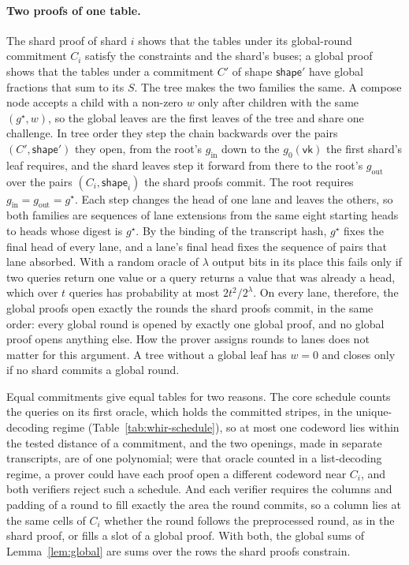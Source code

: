 \paragraph{Two proofs of one table.} The shard proof of shard $i$ shows that the tables under its global-round commitment $C_i$ satisfy the constraints and the shard's buses; a global proof shows that the tables under a commitment $C'$ of shape $\mathsf{shape}'$ have global fractions that sum to its $S$. The tree makes the two families the same. A compose node accepts a child with a non-zero $w$ only after children with the same $(g^\star, w)$, so the global leaves are the first leaves of the tree and share one challenge. In tree order they step the chain backwards over the pairs $(C', \mathsf{shape}')$ they open, from the root's $g_{\mathrm{in}}$ down to the $g_0(\mathsf{vk})$ the first shard's leaf requires, and the shard leaves step it forward from there to the root's $g_{\mathrm{out}}$ over the pairs $(C_i, \mathsf{shape}_i)$ the shard proofs commit. The root requires $g_{\mathrm{in}} = g_{\mathrm{out}} = g^\star$. Each step changes the head of one lane and leaves the others, so both families are sequences of lane extensions from the same eight starting heads to heads whose digest is $g^\star$. By the binding of the transcript hash, $g^\star$ fixes the final head of every lane, and a lane's final head fixes the sequence of pairs that lane absorbed. With a random oracle of $\lambda$ output bits in its place this fails only if two queries return one value or a query returns a value that was already a head, which over $t$ queries has probability at most $2t^2/2^{\lambda}$. On every lane, therefore, the global proofs open exactly the rounds the shard proofs commit, in the same order: every global round is opened by exactly one global proof, and no global proof opens anything else. How the prover assigns rounds to lanes does not matter for this argument. A tree without a global leaf has $w = 0$ and closes only if no shard commits a global round.

Equal commitments give equal tables for two reasons. The core schedule counts the queries on its first oracle, which holds the committed stripes, in the unique-decoding regime (Table~\ref{tab:whir-schedule}), so at most one codeword lies within the tested distance of a commitment, and the two openings, made in separate transcripts, are of one polynomial; were that oracle counted in a list-decoding regime, a prover could have each proof open a different codeword near $C_i$, and both verifiers reject such a schedule. And each verifier requires the columns and padding of a round to fill exactly the area the round commits, so a column lies at the same cells of $C_i$ whether the round follows the preprocessed round, as in the shard proof, or fills a slot of a global proof. With both, the global sums of Lemma~\ref{lem:global} are sums over the rows the shard proofs constrain.

